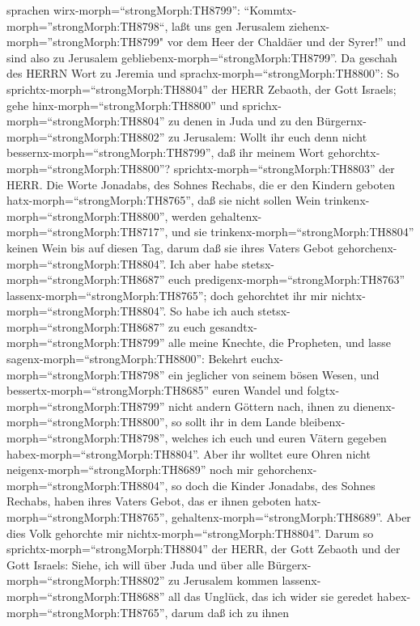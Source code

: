 sprachen wirx-morph=``strongMorph:TH8799'':
``Kommtx-morph=''strongMorph:TH8798``, laßt uns gen Jerusalem
ziehenx-morph=''strongMorph:TH8799" vor dem Heer der Chaldäer und der
Syrer!'' und sind also zu Jerusalem
gebliebenx-morph=``strongMorph:TH8799''.  Da geschah des
HERRN Wort zu Jeremia und sprachx-morph=``strongMorph:TH8800'':
 So sprichtx-morph=``strongMorph:TH8804'' der HERR Zebaoth,
der Gott Israels; gehe hinx-morph=``strongMorph:TH8800'' und
sprichx-morph=``strongMorph:TH8804'' zu denen in Juda und zu den
Bürgernx-morph=``strongMorph:TH8802'' zu Jerusalem: Wollt ihr euch denn
nicht bessernx-morph=``strongMorph:TH8799'', daß ihr meinem Wort
gehorchtx-morph=``strongMorph:TH8800''?
sprichtx-morph=``strongMorph:TH8803'' der HERR.  Die Worte
Jonadabs, des Sohnes Rechabs, die er den Kindern geboten
hatx-morph=``strongMorph:TH8765'', daß sie nicht sollen Wein
trinkenx-morph=``strongMorph:TH8800'', werden
gehaltenx-morph=``strongMorph:TH8717'', und sie
trinkenx-morph=``strongMorph:TH8804'' keinen Wein bis auf diesen Tag,
darum daß sie ihres Vaters Gebot
gehorchenx-morph=``strongMorph:TH8804''. Ich aber habe
stetsx-morph=``strongMorph:TH8687'' euch
predigenx-morph=``strongMorph:TH8763''
lassenx-morph=``strongMorph:TH8765''; doch gehorchtet ihr mir
nichtx-morph=``strongMorph:TH8804''.  So habe ich auch
stetsx-morph=``strongMorph:TH8687'' zu euch
gesandtx-morph=``strongMorph:TH8799'' alle meine Knechte, die Propheten,
und lasse sagenx-morph=``strongMorph:TH8800'': Bekehrt
euchx-morph=``strongMorph:TH8798'' ein jeglicher von seinem bösen Wesen,
und bessertx-morph=``strongMorph:TH8685'' euren Wandel und
folgtx-morph=``strongMorph:TH8799'' nicht andern Göttern nach, ihnen zu
dienenx-morph=``strongMorph:TH8800'', so sollt ihr in dem Lande
bleibenx-morph=``strongMorph:TH8798'', welches ich euch und euren Vätern
gegeben habex-morph=``strongMorph:TH8804''. Aber ihr wolltet eure Ohren
nicht neigenx-morph=``strongMorph:TH8689'' noch mir
gehorchenx-morph=``strongMorph:TH8804'',  so doch die
Kinder Jonadabs, des Sohnes Rechabs, haben ihres Vaters Gebot, das er
ihnen geboten hatx-morph=``strongMorph:TH8765'',
gehaltenx-morph=``strongMorph:TH8689''. Aber dies Volk gehorchte mir
nichtx-morph=``strongMorph:TH8804''.  Darum so
sprichtx-morph=``strongMorph:TH8804'' der HERR, der Gott Zebaoth und der
Gott Israels: Siehe, ich will über Juda und über alle
Bürgerx-morph=``strongMorph:TH8802'' zu Jerusalem kommen
lassenx-morph=``strongMorph:TH8688'' all das Unglück, das ich wider sie
geredet habex-morph=``strongMorph:TH8765'', darum daß ich zu ihnen
